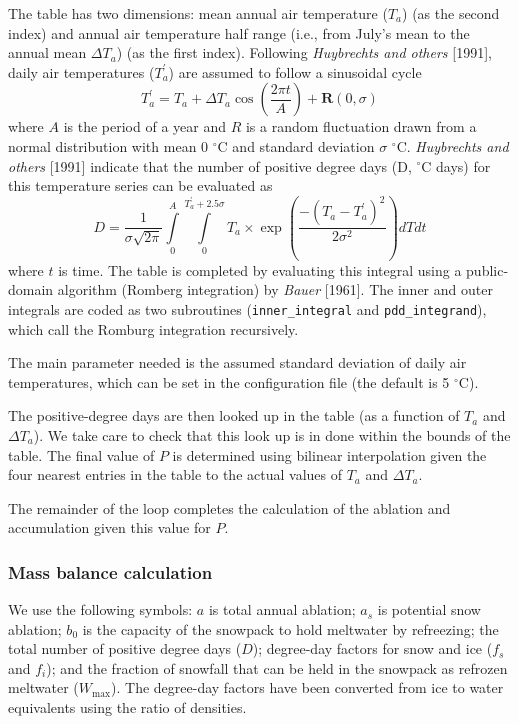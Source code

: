 The table has two dimensions: mean annual air temperature ($T_a$)
(as the second index) and annual air temperature half range (i.e.,
from July's mean to the annual mean $\Delta T_a$) (as the first
index).  Following \emph{Huybrechts and others} [1991], daily air
temperatures ($T_a^\prime$) are assumed to follow a sinusoidal
cycle
\begin{equation}
    T_a^\prime = T_a + \Delta T_a \cos \left( \frac{2 \pi t}{A}
    \right) + \textbf{R}(0,\sigma)
\end{equation}
where $A$ is the period of a year and $R$ is a random fluctuation
drawn from a normal distribution with mean 0 $^\circ$C and
standard deviation $\sigma$ $^\circ$C. \emph{Huybrechts and
others} [1991] indicate that the number of positive degree days
(D, $^\circ$C days) for this temperature series can be evaluated
as
\begin{equation}\label{pdd}
    D = \frac{1}{\sigma \sqrt{2 \pi}}
    \int\limits_0^A
    \int\limits_0^{T_a^\prime+2.5\sigma}
    T_a \times \exp \left( \frac{-(T_a-T_a^\prime)^2}{2 \sigma^2} \right) dT
    dt
\end{equation}
where $t$ is time.  The table is completed by evaluating this integral using a
public-domain algorithm (Romberg integration) by {\it Bauer} [1961]. The
inner and outer integrals are coded as two subroutines
(\texttt{inner\_integral} and \texttt{pdd\_integrand}), which call the Romburg
integration recursively.

The main parameter needed is the assumed standard deviation of
daily air temperatures, which can be set in the configuration file (the
default is 5 $^\circ $C). 

The positive-degree days are then looked up in the table (as a function of
$T_a$ and $\Delta T_a$). We take care to check that this look up is in done
within the bounds of the table.  The final value of $P$ is determined using
bilinear interpolation given the four nearest entries in the table to the
actual values of $T_a$ and $\Delta T_a$.

The remainder of the loop completes the calculation of the
ablation and accumulation given this value for $P$.
%
\subsubsection{Mass balance calculation} 
%
We use the following symbols: $a$ is total annual ablation; $a_s$
is potential snow ablation; $b_0$ is the capacity of the snowpack
to hold meltwater by refreezing; the total number of positive
degree days ($D$); degree-day factors for snow and ice ($f_s$ and
$f_i$); and the fraction of snowfall that can be held in the
snowpack as refrozen meltwater ($W_{\textrm{max}}$). The
degree-day factors have been converted from ice to water
equivalents using the ratio of densities.

